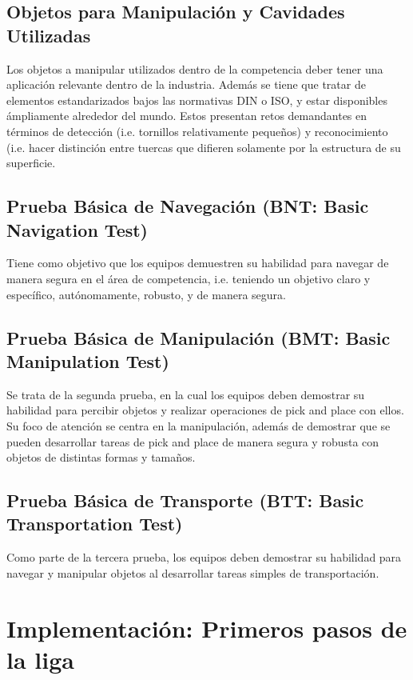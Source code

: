 \documentclass[12pt]{article}
\begin{document}
\subsection{Objetos para Manipulación y Cavidades Utilizadas}

Los objetos a manipular utilizados dentro de la competencia deber tener una aplicación relevante dentro de la industria. Además se tiene que tratar de elementos estandarizados bajos las normativas DIN o ISO, y estar disponibles ámpliamente alrededor del mundo. Estos presentan retos demandantes en términos de detección (i.e. tornillos relativamente pequeños) y reconocimiento (i.e. hacer distinción entre tuercas que difieren solamente por la estructura de su superficie.

\subsection{Prueba Básica de Navegación (BNT: Basic Navigation Test)}

Tiene como objetivo que los equipos demuestren su habilidad para navegar de manera segura en el área de competencia, i.e. teniendo un objetivo claro y específico, autónomamente, robusto, y de manera segura.

\subsection{Prueba Básica de Manipulación (BMT: Basic Manipulation Test)}

Se trata de la segunda prueba, en la cual los equipos deben demostrar su habilidad para percibir objetos y realizar operaciones de pick and place con ellos. Su foco de atención se centra en la manipulación, además de demostrar que se pueden desarrollar tareas de pick and place de manera segura y robusta con objetos de distintas formas y tamaños.

\subsection{Prueba Básica de Transporte (BTT: Basic Transportation Test)}

Como parte de la tercera prueba, los equipos deben demostrar su habilidad para navegar y manipular objetos al desarrollar tareas simples de transportación.

\section{Implementación: Primeros pasos de la liga}
\end{document}
